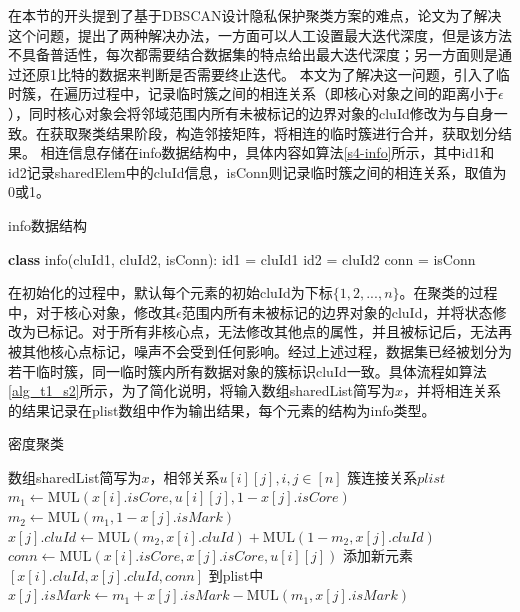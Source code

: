 在本节的开头提到了基于DBSCAN设计隐私保护聚类方案的难点，论文\cite{bozdemir2021privacy}为了解决这个问题，提出了两种解决办法，一方面可以人工设置最大迭代深度，但是该方法不具备普适性，每次都需要结合数据集的特点给出最大迭代深度；另一方面则是通过还原1比特的数据来判断是否需要终止迭代。
本文为了解决这一问题，引入了临时簇，在遍历过程中，记录临时簇之间的相连关系（即核心对象之间的距离小于$\epsilon$），同时核心对象会将邻域范围内所有未被标记的边界对象的cluId修改为与自身一致。在获取聚类结果阶段，构造邻接矩阵，将相连的临时簇进行合并，获取划分结果。
相连信息存储在info数据结构中，具体内容如算法\ref{s4-info}所示，其中id1和id2记录sharedElem中的cluId信息，isConn则记录临时簇之间的相连关系，取值为0或1。
\begin{algorithm}
	\caption{info数据结构}
	\label{s4-info}
	\begin{algorithmic}[1]
		\STATE \textbf{class} info(cluId1, cluId2, isConn):
		\STATE \hspace{\algorithmicindent} id1 = cluId1
		\STATE \hspace{\algorithmicindent} id2 = cluId2
		\STATE \hspace{\algorithmicindent} conn = isConn
	\end{algorithmic}
\end{algorithm}

在初始化的过程中，默认每个元素的初始cluId为下标$ \{1,2,...,n\} $。在聚类的过程中，对于核心对象，修改其$ \epsilon $范围内所有未被标记的边界对象的cluId，并将状态修改为已标记。对于所有非核心点，无法修改其他点的属性，并且被标记后，无法再被其他核心点标记，噪声不会受到任何影响。经过上述过程，数据集已经被划分为若干临时簇，同一临时簇内所有数据对象的簇标识cluId一致。具体流程如算法\ref{alg_t1_s2}所示，为了简化说明，将输入数组sharedList简写为$ x $，并将相连关系的结果记录在plist数组中作为输出结果，每个元素的结构为info类型。
\begin{algorithm}[htbp]
	\renewcommand{\algorithmicrequire}{\textbf{输入:}}
	\renewcommand{\algorithmicensure}{\textbf{输出:}}
	\caption{密度聚类}
	\label{alg_t1_s2}
	\begin{algorithmic}[1]
		\REQUIRE 数组sharedList简写为$ x $，相邻关系$ u[i][j],i,j\in[n] $
		\ENSURE 簇连接关系$ plist $
		\STATE $ m_1 \leftarrow \text{MUL}(x[i].isCore, u[i][j], 1-x[j].isCore) $
		\STATE $ m_2 \leftarrow \text{MUL}(m_1, 1-x[j].isMark) $
		\STATE $ x[j].cluId \leftarrow  \text{MUL}(m_2, x[i].cluId) + \text{MUL}(1-m_2, x[j].cluId)$
		\STATE $ conn \leftarrow \text{MUL}(x[i].isCore, x[j].isCore, u[i][j]) $
		\STATE 添加新元素 $ [x[i].cluId, x[j].cluId, conn] $ 到plist中
		\STATE $ x[j].isMark \leftarrow m_1 + x[j].isMark - \text{MUL}(m_1, x[j].isMark) $
		\ENDFOR
		\ENDFOR
	\end{algorithmic}
\end{algorithm}

